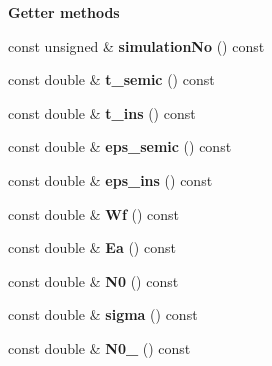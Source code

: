 \begin{Indent}{\bf Getter methods}\par
\begin{DoxyCompactItemize}
\item 
\hypertarget{classParamList_a012be3a46bf086c10c0b8906b1c0ece1}{const unsigned \& {\bfseries simulation\-No} () const }\label{classParamList_a012be3a46bf086c10c0b8906b1c0ece1}

\item 
\hypertarget{classParamList_aaa4ab91dd1fb090f0d91a4c703e8c55a}{const double \& {\bfseries t\-\_\-semic} () const }\label{classParamList_aaa4ab91dd1fb090f0d91a4c703e8c55a}

\item 
\hypertarget{classParamList_a186672cc6a2eec77e726ab8337791822}{const double \& {\bfseries t\-\_\-ins} () const }\label{classParamList_a186672cc6a2eec77e726ab8337791822}

\item 
\hypertarget{classParamList_a4375bbd2e7ad0cede170a5ceb3f14bd0}{const double \& {\bfseries eps\-\_\-semic} () const }\label{classParamList_a4375bbd2e7ad0cede170a5ceb3f14bd0}

\item 
\hypertarget{classParamList_a26c5e5f7e2f9768a5dfb927ab2f27b0c}{const double \& {\bfseries eps\-\_\-ins} () const }\label{classParamList_a26c5e5f7e2f9768a5dfb927ab2f27b0c}

\item 
\hypertarget{classParamList_adcd107e7354e9fc5b74af7315fa7df80}{const double \& {\bfseries Wf} () const }\label{classParamList_adcd107e7354e9fc5b74af7315fa7df80}

\item 
\hypertarget{classParamList_a7bb2ca3a9d5d0c39b2236a9bcb3e0815}{const double \& {\bfseries Ea} () const }\label{classParamList_a7bb2ca3a9d5d0c39b2236a9bcb3e0815}

\item 
\hypertarget{classParamList_a208a97deee7c9c07aa4a24563c116b43}{const double \& {\bfseries N0} () const }\label{classParamList_a208a97deee7c9c07aa4a24563c116b43}

\item 
\hypertarget{classParamList_aeab76c5d57194aecd33538540db7c42f}{const double \& {\bfseries sigma} () const }\label{classParamList_aeab76c5d57194aecd33538540db7c42f}

\item 
\hypertarget{classParamList_af17ca56cc73a7ebadb577308bd5b7ad6}{const double \& {\bfseries N0\-\_} () const }\label{classParamList_af17ca56cc73a7ebadb577308bd5b7ad6}


\end{DoxyCompactItemize}
\end{Indent}
